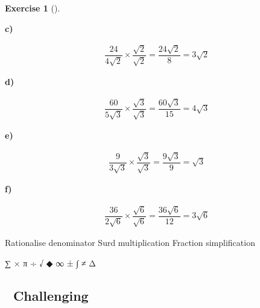 \documentclass[
  letterpaper,
  DIV=11,
  numbers=noendperiod]{scrreprt}
\theoremstyle{definition}
\newtheorem{exercise}{Exercise}[chapter]
\theoremstyle{remark}
\begin{document}
\begin{exercise}[]
\begin{tcolorbox}
\textbf{c)}

\[
\begin{aligned}
\dfrac{24}{4\sqrt{2}}\times\dfrac{\sqrt{2}}{\sqrt{2}}=\dfrac{24\sqrt{2}}{8}=3\sqrt{2}
\end{aligned}
\]

\textbf{d)}

\[
\begin{aligned}
\dfrac{60}{5\sqrt{3}}\times\dfrac{\sqrt{3}}{\sqrt{3}}=\dfrac{60\sqrt{3}}{15}=4\sqrt{3}
\end{aligned}
\]

\textbf{e)}

\[
\begin{aligned}
\dfrac{9}{3\sqrt{3}}\times\dfrac{\sqrt{3}}{\sqrt{3}}=\dfrac{9\sqrt{3}}{9}=\sqrt{3}
\end{aligned}
\]

\textbf{f)}

\[
\begin{aligned}
\dfrac{36}{2\sqrt{6}}\times\dfrac{\sqrt{6}}{\sqrt{6}}=\dfrac{36\sqrt{6}}{12}=3\sqrt{6}
\end{aligned}
\]

\end{tcolorbox}

{Rationalise denominator} {Surd multiplication} {Fraction
simplification}

\end{exercise}

∑ × π ÷ √ ◆ ∞ ± ∫ ≠ Δ

\subsection{🔴 Challenging}
\end{document}
